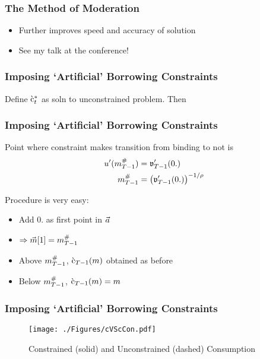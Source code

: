 \documentclass{beamer}
\begin{document}
\begin{frame}[label=MoM]
\frametitle{The Method of Moderation}

\begin{itemize}
\item Further improves speed and accuracy of solution
\item See my talk at the conference!
\end{itemize}

\end{frame}

\begin{frame}
\frametitle{Imposing `Artificial' Borrowing Constraints}


\pause 

Define $\grave{\mathrm{c}}^{*}_{t}$ as soln to unconstrained problem.  Then


\end{frame}

\begin{frame}
\frametitle{Imposing `Artificial' Borrowing Constraints}

Point where constraint makes transition from binding to not is
\begin{equation*}\begin{gathered}\begin{aligned}
    u^{\prime}(m_{T-1}^{\#})  & = \mathfrak{v}^{\prime}_{T-1}(0.)
\\  m_{T-1}^{\#}  & = \left(\mathfrak{v}^{\prime}_{T-1}(0.)\right)^{-1/{\rho}}
\end{aligned}\end{gathered}\end{equation*}
\pause\medskip

Procedure is very easy:
\begin{itemize}
\item Add $0.$ as first point in $\vec{a}$
\item $\Rightarrow \vec{m}[1] = m_{T-1}^{\#}$
\item Above $m_{T-1}^{\#}$, $\grave{\mathrm{c}}_{T-1}(m)$ obtained as before
\item Below $m_{T-1}^{\#}$, $\grave{\mathrm{c}}_{T-1}(m)=m$
\end{itemize}

\end{frame}

\begin{frame}
\frametitle{Imposing `Artificial' Borrowing Constraints}
\begin{figure}
\texttt{[image: ./Figures/cVScCon.pdf]}
        \caption{Constrained (solid) and Unconstrained (dashed) Consumption}
        \label{fig:cVScCon}
\end{figure}

\end{frame}
\end{document}
